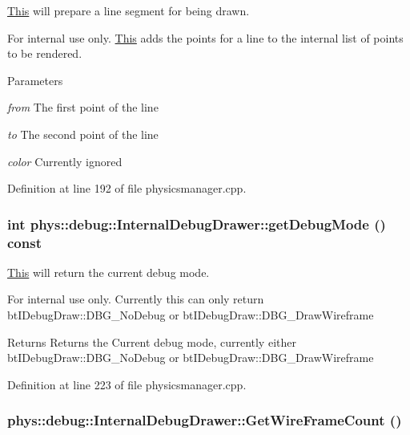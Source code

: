 \hyperlink{structThis}{This} will prepare a line segment for being drawn. 

\begin{DoxyInternal}{For internal use only.}
\hyperlink{structThis}{This} adds the points for a line to the internal list of points to be rendered. 
\begin{DoxyParams}{Parameters}
\item[{\em from}]The first point of the line \item[{\em to}]The second point of the line \item[{\em color}]Currently ignored \end{DoxyParams}
\end{DoxyInternal}


Definition at line 192 of file physicsmanager.cpp.

\hypertarget{classphys_1_1debug_1_1InternalDebugDrawer_aba329861569d741e970ce5aafb668e84}{
\subsubsection[{getDebugMode}]{\setlength{\rightskip}{0pt plus 5cm}int phys::debug::InternalDebugDrawer::getDebugMode () const}}
\label{db/d27/classphys_1_1debug_1_1InternalDebugDrawer_aba329861569d741e970ce5aafb668e84}


\hyperlink{structThis}{This} will return the current debug mode. 

\begin{DoxyInternal}{For internal use only.}
Currently this can only return btIDebugDraw::DBG\_\-NoDebug or btIDebugDraw::DBG\_\-DrawWireframe \begin{DoxyReturn}{Returns}
Returns the Current debug mode, currently either btIDebugDraw::DBG\_\-NoDebug or btIDebugDraw::DBG\_\-DrawWireframe 
\end{DoxyReturn}
\end{DoxyInternal}


Definition at line 223 of file physicsmanager.cpp.

\hypertarget{classphys_1_1debug_1_1InternalDebugDrawer_aa1666e636e6ff81813c0b1a85d7bc157}{
\subsubsection[{GetWireFrameCount}]{ phys::debug::InternalDebugDrawer::GetWireFrameCount ()}}
\label{db/d27/classphys_1_1debug_1_1InternalDebugDrawer_aa1666e636e6ff81813c0b1a85d7bc157}



